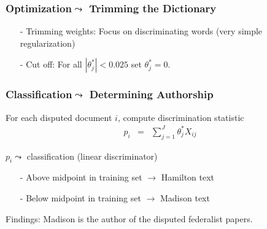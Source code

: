 \documentclass{beamer}
\numberwithin{equation}{section}
\begin{document}
\begin{frame}
\frametitle{Optimization$\leadsto$ Trimming the Dictionary}


\begin{itemize}
\item[-] Trimming weights: Focus on discriminating words (very simple \alert{regularization})
\item[-] Cut off: For all $|\theta^{*}_{j}|<0.025$ set $\theta^{*}_{j} = 0$.  
\end{itemize}



\end{frame}


\begin{frame}
\frametitle{Classification$\leadsto$ Determining Authorship}

For each disputed document $i$, compute discrimination statistic
\begin{eqnarray}
p_{i}  & = & \sum_{j =1}^{J} \theta^{*}_{j} X_{ij} \nonumber 
\end{eqnarray}

$p_i \leadsto$ classification (\alert{linear discriminator})
\begin{itemize}
\item[-] Above midpoint in training set $\rightarrow$ Hamilton text
\item[-] Below midpoint in training set $\rightarrow$ Madison text
\end{itemize}

\alert{Findings}: Madison is the author of the disputed federalist papers.  
 

\end{frame}
\end{document}
